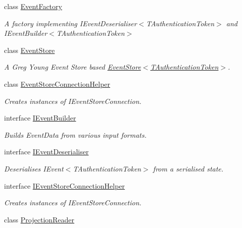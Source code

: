 \begin{DoxyCompactItemize}
\item 
class \hyperlink{classCqrs_1_1EventStore_1_1EventFactory}{Event\+Factory}
\begin{DoxyCompactList}\small\item\em A factory implementing I\+Event\+Deserialiser$<$\+T\+Authentication\+Token$>$ and I\+Event\+Builder$<$\+T\+Authentication\+Token$>$ \end{DoxyCompactList}\item 
class \hyperlink{classCqrs_1_1EventStore_1_1EventStore}{Event\+Store}
\begin{DoxyCompactList}\small\item\em A Greg Young Event Store based \hyperlink{classCqrs_1_1EventStore_1_1EventStore_ab48ad2c9d72780ae3a662e213498f194_ab48ad2c9d72780ae3a662e213498f194}{Event\+Store$<$\+T\+Authentication\+Token$>$}. \end{DoxyCompactList}\item 
class \hyperlink{classCqrs_1_1EventStore_1_1EventStoreConnectionHelper}{Event\+Store\+Connection\+Helper}
\begin{DoxyCompactList}\small\item\em Creates instances of I\+Event\+Store\+Connection. \end{DoxyCompactList}\item 
interface \hyperlink{interfaceCqrs_1_1EventStore_1_1IEventBuilder}{I\+Event\+Builder}
\begin{DoxyCompactList}\small\item\em Builds Event\+Data from various input formats. \end{DoxyCompactList}\item 
interface \hyperlink{interfaceCqrs_1_1EventStore_1_1IEventDeserialiser}{I\+Event\+Deserialiser}
\begin{DoxyCompactList}\small\item\em Deserialises I\+Event$<$\+T\+Authentication\+Token$>$ from a serialised state. \end{DoxyCompactList}\item 
interface \hyperlink{interfaceCqrs_1_1EventStore_1_1IEventStoreConnectionHelper}{I\+Event\+Store\+Connection\+Helper}
\begin{DoxyCompactList}\small\item\em Creates instances of I\+Event\+Store\+Connection. \end{DoxyCompactList}\item 
class \hyperlink{classCqrs_1_1EventStore_1_1ProjectionReader}{Projection\+Reader}

\end{DoxyCompactItemize}

